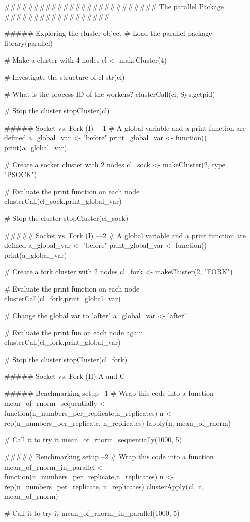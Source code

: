 ##########################  The parallel Package   ##################

##### Exploring the cluster object
# Load the parallel package
library(parallel)

# Make a cluster with 4 nodes
cl <- makeCluster(4)

# Investigate the structure of cl
str(cl)

# What is the process ID of the workers?
clusterCall(cl, Sys.getpid)

# Stop the cluster
stopCluster(cl)


##### Socket vs. Fork (I) ---1
# A global variable and a print function are defined
a_global_var <- "before"
print_global_var <- function() print(a_global_var)

# Create a socket cluster with 2 nodes
cl_sock <- makeCluster(2, type = "PSOCK")

# Evaluate the print function on each node
  clusterCall(cl_sock,print_global_var)

# Stop the cluster
stopCluster(cl_sock)


##### Socket vs. Fork (I) ---2
# A global variable and a print function are defined
a_global_var <- "before"
print_global_var <- function() print(a_global_var)

# Create a fork cluster with 2 nodes
cl_fork <- makeCluster(2, "FORK")

# Evaluate the print function on each node
clusterCall(cl_fork,print_global_var)

# Change the global var to "after"
a_global_var <- 'after'

# Evaluate the print fun on each node again
clusterCall(cl_fork,print_global_var)

# Stop the cluster
stopCluster(cl_fork)


##### Socket vs. Fork (II)
A and C


##### Benchmarking setup --1
# Wrap this code into a function
mean_of_rnorm_sequentially <- function(n_numbers_per_replicate,n_replicates)
{
n <- rep(n_numbers_per_replicate, n_replicates)
lapply(n, mean_of_rnorm)
}

# Call it to try it
mean_of_rnorm_sequentially(1000, 5)


##### Benchmarking setup --2
# Wrap this code into a function
mean_of_rnorm_in_parallel <- function(n_numbers_per_replicate,n_replicates){
n <- rep(n_numbers_per_replicate, n_replicates)
clusterApply(cl, n, mean_of_rnorm) 
}

# Call it to try it
mean_of_rnorm_in_parallel(1000, 5)


